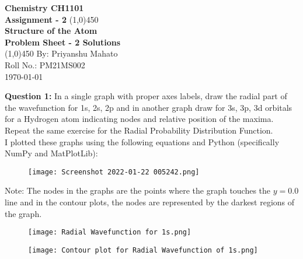 \documentclass[11pt]{article}
\begin{document}
		\thispagestyle{empty}
		\begin{titlepage}
			\begin{center}
				\vspace{2cm}
				\Large\textbf{Chemistry CH1101}\\
				\vspace{1cm}
				\large\textbf{Assignment - 2}
				\vfill
			    \line(1,0){450}\\[16pt]
			    \huge\textbf{Structure of the Atom}\\[10pt]
			    \large\textbf{Problem Sheet - 2 Solutions}\\[16pt]
			    \line(1,0){450}
			    \vfill
			    By: Priyanshu Mahato\\
			    Roll No.: PM21MS002\\
			    \today\\				
			\end{center}
		\end{titlepage}
	\setcounter{page}{1}
	\textbf{Question 1:} In a single graph with proper axes labels, draw the radial part of the wavefunction for 1s, 2s,
	2p and in another graph draw for 3s, 3p, 3d orbitals for a Hydrogen atom indicating nodes and relative position of the maxima. Repeat the same exercise for the Radial Probability 
	Distribution Function.\\[16pt]
	
	I plotted these graphs using the following equations and Python (specifically NumPy and MatPlotLib):\\[16pt]
	
		\begin{figure}[H]
		\centering
		\texttt{[image: Screenshot 2022-01-22 005242.png]}
		\label{figure:pta}
	\end{figure}
	
	Note: The nodes in the graphs are the points where the graph touches the $y=0.0$ line and in the contour plots, the nodes are represented by the darkest regions of the graph.\\[16pt]
	
	\begin{figure}[H]
		\centering
		\texttt{[image: Radial Wavefunction for 1s.png]}
		\label{figure:RW1s}
	\end{figure}

	\begin{figure}[H]
		\centering
		\texttt{[image: Contour plot for Radial Wavefunction of 1s.png]}
		\label{figure:CRW1s}
	\end{figure}
	
\end{document}
